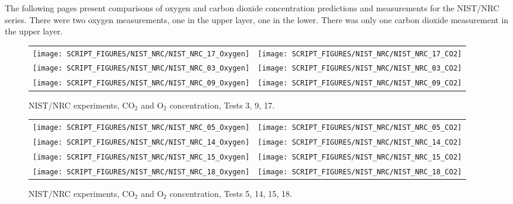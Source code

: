The following pages present comparisons of oxygen and carbon dioxide concentration predictions and measurements for the
NIST/NRC series. There were two oxygen measurements, one in the upper layer, one in the lower.  There was only one carbon
dioxide measurement in the upper layer.

\begin{figure}[h]
\begin{tabular*}{\textwidth}{l@{\extracolsep{\fill}}r}
\texttt{[image: SCRIPT\_FIGURES/NIST\_NRC/NIST\_NRC\_17\_Oxygen]} &
\texttt{[image: SCRIPT\_FIGURES/NIST\_NRC/NIST\_NRC\_17\_CO2]} \\
\texttt{[image: SCRIPT\_FIGURES/NIST\_NRC/NIST\_NRC\_03\_Oxygen]} &
\texttt{[image: SCRIPT\_FIGURES/NIST\_NRC/NIST\_NRC\_03\_CO2]} \\
\texttt{[image: SCRIPT\_FIGURES/NIST\_NRC/NIST\_NRC\_09\_Oxygen]} &
\texttt{[image: SCRIPT\_FIGURES/NIST\_NRC/NIST\_NRC\_09\_CO2]}
\end{tabular*}
\caption[NIST/NRC experiments, CO$_2$ and O$_2$ concentration, Tests 3, 9, 17]{NIST/NRC experiments, CO$_2$ and O$_2$ concentration, Tests 3, 9, 17.}
\label{NIST_NRC_Gas_Open_1}
\end{figure}

\newpage

\begin{figure}[p]
\begin{tabular*}{\textwidth}{l@{\extracolsep{\fill}}r}
\texttt{[image: SCRIPT\_FIGURES/NIST\_NRC/NIST\_NRC\_05\_Oxygen]} &
\texttt{[image: SCRIPT\_FIGURES/NIST\_NRC/NIST\_NRC\_05\_CO2]} \\
\texttt{[image: SCRIPT\_FIGURES/NIST\_NRC/NIST\_NRC\_14\_Oxygen]} &
\texttt{[image: SCRIPT\_FIGURES/NIST\_NRC/NIST\_NRC\_14\_CO2]} \\
\texttt{[image: SCRIPT\_FIGURES/NIST\_NRC/NIST\_NRC\_15\_Oxygen]} &
\texttt{[image: SCRIPT\_FIGURES/NIST\_NRC/NIST\_NRC\_15\_CO2]} \\
\texttt{[image: SCRIPT\_FIGURES/NIST\_NRC/NIST\_NRC\_18\_Oxygen]} &
\texttt{[image: SCRIPT\_FIGURES/NIST\_NRC/NIST\_NRC\_18\_CO2]}
\end{tabular*}
\caption[NIST/NRC experiments, CO$_2$ and O$_2$ concentration, Tests 5, 14, 15, 18]{NIST/NRC experiments, CO$_2$ and O$_2$ concentration, Tests 5, 14, 15, 18.}
\label{NIST_NRC_Gas_Open_2}
\end{figure}


